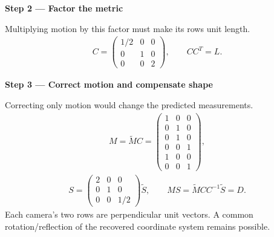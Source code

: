 \documentclass[letterpaper,11pt,english,openany,oneside]{jupyterBook}
\begin{document}
\begin{TextbookBox}
\par\medskip{}
{\color{QuizStepRed}\bfseries Step 2 — Factor the metric}\par\smallskip

\sphinxAtStartPar
{} Multiplying motion by this factor must make its rows unit length.
{\color{QuizMathBlue} \begin{equation*}
\begin{split}C=\begin{pmatrix}1/2&0&0\\0&1&0\\0&0&2\end{pmatrix},\qquad CC^T=L.\end{split}
\end{equation*}}
\par

\par\medskip{}
{\color{QuizStepRed}\bfseries Step 3 — Correct motion and compensate shape}\par\smallskip

\sphinxAtStartPar
{} Correcting only motion would change the predicted measurements.
{\color{QuizMathBlue} \begin{equation*}
\begin{split}M=\widetilde MC=\begin{pmatrix}1&0&0\\0&1&0\\0&1&0\\0&0&1\\1&0&0\\0&0&1\end{pmatrix},\end{split}
\end{equation*}}{\color{QuizMathBlue} \begin{equation*}
\begin{split}S=\begin{pmatrix}2&0&0\\0&1&0\\0&0&1/2\end{pmatrix}\widetilde S,\qquad
MS=\widetilde MCC^{-1}\widetilde S=D.\end{split}
\end{equation*}}
\sphinxAtStartPar
Each camera’s two rows are perpendicular unit vectors. A common rotation/reflection of the recovered coordinate system remains possible.

\par

\end{TextbookBox}
\end{document}
